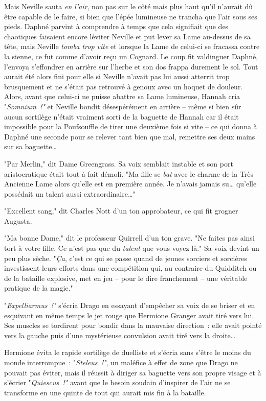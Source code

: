 Mais Neville sauta \emph{en l'air}, non pas sur le côté mais plus haut qu'il n'aurait dû être capable de le faire, si bien que l'épée lumineuse ne trancha que l'air sous ses pieds. Daphné parvint à comprendre à temps que cela signifiait que des chaotiques faisaient encore léviter Neville et put lever sa Lame au-dessus de sa tête, mais Neville \emph{tomba trop vite} et lorsque la Lame de celui-ci se fracassa contre la sienne, ce fut comme d'avoir reçu un Cognard. Le coup fit valdinguer Daphné, l'envoya s'effondrer en arrière sur l'herbe et son dos frappa durement le sol. Tout aurait été alors fini pour elle si Neville n'avait pas lui aussi atterrit trop brusquement et ne s'était pas retrouvé à genoux avec un hoquet de douleur. Alors, avant que celui-ci ne puisse abattre sa Lame lumineuse, Hannah cria "\emph{Somnium~!"} et Neville bondit désespérément en arrière -- même si bien sûr aucun sortilège n'était vraiment sorti de la baguette de Hannah car il était impossible pour la Poufsouffle de tirer une deuxième fois si vite -- ce qui donna à Daphné une seconde pour se relever tant bien que mal, remettre ses deux mains sur sa baguette…

\later

"Par Merlin," dit Dame Greengrass. Sa voix semblait instable et son port aristocratique était tout à fait démoli. "Ma fille se \emph{bat} avec le charme de la Très Ancienne Lame alors qu'elle est en première année. Je n'avais jamais su… qu'elle possédait un talent aussi extraordinaire…"

"Excellent sang," dit Charles Nott d'un ton approbateur, ce qui fit grogner Augusta.

"Ma bonne Dame," dit le professeur Quirrell d'un ton grave. "Ne faites pas ainsi tort à votre fille. Ce n'est pas que du \emph{talent} que vous voyez là." Sa voix devint un peu plus sèche. "\emph{Ça}, c'est ce qui se passe quand de jeunes sorciers et sorcières investissent leurs efforts dans une compétition qui, au contraire du Quidditch ou de la bataille explosive, met en jeu -- pour le dire franchement -- une véritable pratique de la magie."

\later

"\emph{Expelliarmus~!"} s'écria Drago en essayant d'empêcher sa voix de se briser et en esquivant en même temps le jet rouge que Hermione Granger avait tiré vers lui. Ses muscles se tordirent pour bondir dans la mauvaise direction~: elle avait pointé vers la gauche puis d'une mystérieuse convulsion avait tiré vers la droite…

Hermione évita le rapide sortilège de duelliste et s'écria sans s'être le moins du monde interrompue~: "\emph{Steleus~!"}, un maléfice à effet de zone que Drago ne pouvait pas éviter, mais il réussit à diriger sa baguette vers son propre visage et à s'écrier "\emph{Quiescus~!"} avant que le besoin soudain d'inspirer de l'air ne se transforme en une quinte de tout qui aurait mis fin à la bataille.

